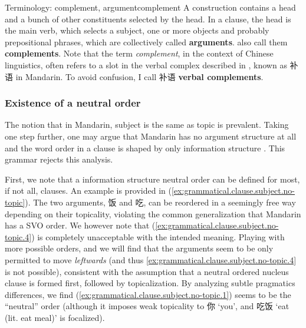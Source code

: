\documentclass[UTF8, a4paper, oneside, scheme=plain, 12pt]{ctexrep}
\newcommand*{\concept}[1]{\textbf{#1}}
\newcommand*{\term}[1]{\emph{#1}}
\newcommand{\translate}[1]{`#1'}
\begin{document}
\begin{theorybox}{Terminology: complement, argument}{complement}
    A construction contains a head and a bunch of other constituents selected by the head.
    In a clause, the head is the main verb,
    which selects a subject, one or more objects and probably prepositional phrases,
    which are collectively called \concept{arguments}.
    \citet{cgel} also call them \concept{complements}.
    Note that the term \term{complement}, in the context of Chinese linguistics,
    often refers to a slot in the verbal complex described in ,
    known as 补语 in Mandarin.
    To avoid confusion, I call 补语 \concept{verbal complements}.
\end{theorybox}

\subsubsection{Existence of a neutral order}\label{sec:grammatical.clause.subject.topic}

The notion that in Mandarin, subject is the same as topic is prevalent.
Taking one step further, one may argue that Mandarin has no argument structure at all
and the word order in a clause is shaped by only information structure \citep{lapolla20091}.
This grammar rejects this analysis.

First, we note that a information structure neutral order can be defined for most, if not all, clauses.
An example is provided in (\ref{ex:grammatical.clause.subject.no-topic}).
The two arguments, 饭 and 吃, can be reordered in a seemingly free way depending on their topicality,
violating the common generalization that Mandarin has a SVO order.
We however note that (\ref{ex:grammatical.clause.subject.no-topic.4})
is completely unacceptable with the intended meaning.
Playing with more possible orders, and we will find that the arguments seem to be
only permitted to move \emph{leftwards} (and thus \ref{ex:grammatical.clause.subject.no-topic.4} is not possible),
consistent with the assumption that a neutral ordered nucleus clause is formed first,
followed by topicalization.
By analyzing subtle pragmatics differences, we find (\ref{ex:grammatical.clause.subject.no-topic.1}) seems to be the ``neutral'' order 
(although it imposes weak topicality to 你 \translate{you},
and 吃饭 \translate{eat (lit. eat meal)} is focalized).
\end{document}
